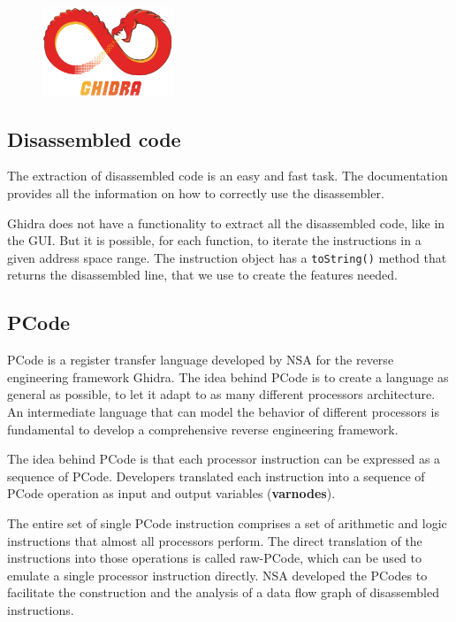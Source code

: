 \begin{figure}[ht!]
	\centering
	\includegraphics[width=0.35\textwidth]{ghidra}
	
\end{figure}

\subsection{Disassembled code}

The extraction of disassembled code is an easy and fast task. The documentation provides all the information on how to correctly use the disassembler. 

Ghidra does not have a functionality to extract all the disassembled code, like in the GUI. But it is possible, for each function, to iterate the instructions in a given address space range. The instruction object has a \texttt{toString()} method that returns the disassembled line, that we use to create the features needed.

\subsection{PCode}
PCode is a register transfer language developed by NSA for the reverse engineering framework Ghidra. The idea behind PCode is to create a language as general as possible, to let it adapt to as many different processors architecture. An intermediate language that can model the behavior of different processors is fundamental to develop a comprehensive reverse engineering framework.

The idea behind PCode is that each processor instruction can be expressed as a sequence of PCode. Developers translated each instruction into a sequence of PCode operation as input and output variables (\textbf{varnodes}).

The entire set of single PCode instruction comprises a set of arithmetic and logic instructions that almost all processors perform. The direct translation of the instructions into those operations is called raw-PCode, which can be used to emulate a single processor instruction directly. NSA developed the PCodes to facilitate the construction and the analysis of a data flow graph of disassembled instructions.

